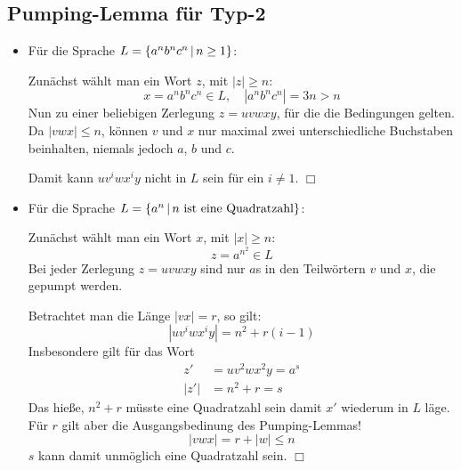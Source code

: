 \subsection{Pumping-Lemma für Typ-2}
\begin{itemize}
	\item
	Für die Sprache $L=\left\{ a^nb^nc^n \,\middle|\, n\geq 1 \right\}$:

	Zunächst wählt man ein Wort $z$, mit $|z|\geq n$:
	\begin{equation*}
		x=a^nb^nc^n \in L,\quad |a^nb^nc^n|=3n>n
	\end{equation*}
	Nun zu einer beliebigen Zerlegung $z=uvwxy$, für die die Bedingungen gelten. Da $|vwx|\leq n$, können $v$ und $x$ nur maximal zwei unterschiedliche Buchstaben beinhalten, niemals jedoch $a$, $b$ und $c$.

	Damit kann $uv^iwx^iy$ nicht in $L$ sein für ein $i\neq 1$. \hfill $\Box$
	\item
	Für die Sprache $L=\left\{ a^n \,\middle|\, n \text{ ist eine Quadratzahl} \right\}$:

	Zunächst wählt man ein Wort $x$, mit $|x|\geq n$:
	\begin{equation*}
		z=a^{n^2} \in L
	\end{equation*}
	Bei jeder Zerlegung $z=uvwxy$ sind nur $a$s in den Teilwörtern $v$ und $x$, die gepumpt werden.

	Betrachtet man die Länge $|vx|=r$, so gilt:
	\begin{equation*}
		|uv^iwx^iy|=n^2+r(i-1)
	\end{equation*}
	Insbesondere gilt für das Wort
	\begin{align*}
		z'&=uv^2wx^2y=a^s\\
		|z'|&=n^2+r=s
	\end{align*}
	Das hieße, $n^2+r$ müsste eine Quadratzahl sein damit $x'$ wiederum in $L$ läge.
  Für $r$ gilt aber die Ausgangsbedinung des Pumping-Lemmas!
	\begin{equation*}
		|vwx|=r+|w|\leq n
	\end{equation*}
	$s$ kann damit unmöglich eine Quadratzahl sein. \hfill $\Box$
\end{itemize}
